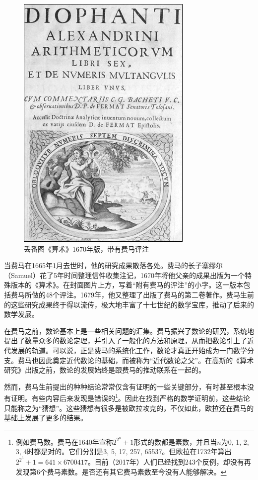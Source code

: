\documentclass[b5paper]{ctexart}
\begin{document}
\begin{figure}
 \centering
 \includegraphics[scale=0.4]{img/Arithmetica.jpg}
 \captionsetup{labelformat=empty}
 \caption{丢番图《算术》1670年版，带有费马评注}
 \label{fig:Arithmetica}
\end{figure}

当费马在1665年1月去世时，他的研究成果散落各处。费马的长子塞缪尔（Samuel）花了5年时间整理信件收集注记，1670年将他父亲的成果出版为一个特殊版本的《算术》。在封面图片上方，写着“附有费马的评注”的小字。这一版本包括费马所做的48个评注。1679年，他又整理了出版了费马的第二卷著作。费马生前的这些研究成果终于得以流传，极大地丰富了十七世纪的数学宝库，推动了后来的数学发展。

在费马之前，数论基本上是一些相关问题的汇集。费马振兴了数论的研究，系统地提出了数量众多的数论定理，并引入了一般化的方法和原理，从而把数论引上了近代发展的轨道。可以说，正是费马的系统化工作，数论才真正开始成为一门数学分支。费马也因此奠定近代数论的基础，而被称为“近代数论之父”。在高斯的《算术研究》出版之前，数论的发展始终是跟费马的推动联系在一起的。

然而，费马生前提出的种种结论常常仅含有证明的一些关键部分，有时甚至根本没有证明。有些内容后来发现是错误的\footnote{例如费马数。费马在1640年宣称$2^{2^n}+1$形式的数都是素数，并且当$n$为0, 1, 2, 3, 4时都是对的。它们分别是3, 5, 17, 257, 65537。但欧拉在1732年算出$2^{2^5} + 1 = 641 \times 6700417$。目前（2017年）人们已经找到243个反例，却没有再发现第6个费马素数。是否还有其它费马素数至今没有人能够解决。}。因此在找到严格的数学证明前，这些结论只能称之为“猜想”。这些猜想有很多是被欧拉攻克的，不仅如此，欧拉还在费马的基础上发展了更多的结果。
\end{document}
